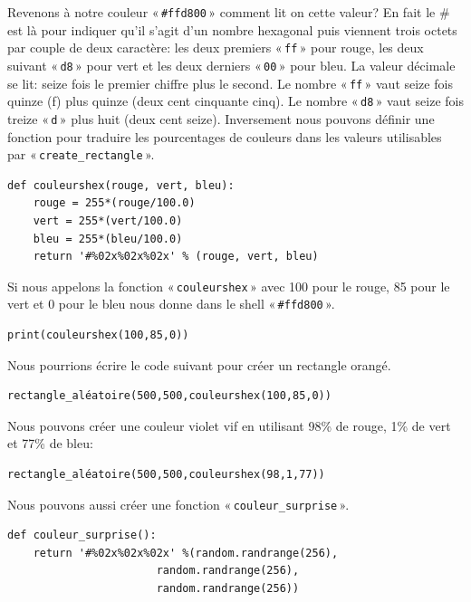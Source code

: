 Revenons à notre couleur « \texttt{\#ffd800} » comment lit on cette valeur? En fait le \# est là pour indiquer qu'il s'agit d'un nombre hexagonal puis viennent trois octets par couple de deux caractère: les deux premiers « \texttt{ff} » pour rouge, les deux suivant « \texttt{d8} » pour vert et les deux derniers « \texttt{00} » pour bleu. La valeur décimale se lit: seize fois le premier chiffre plus le second. Le nombre « \texttt{ff} » vaut seize fois quinze (f) plus quinze (deux cent cinquante cinq). Le nombre « \texttt{d8} » vaut seize fois treize  « \texttt{d} » plus huit (deux cent seize). Inversement nous pouvons définir une fonction pour traduire les pourcentages de couleurs dans les valeurs utilisables par « \texttt{create\_rectangle} ».

\begin{Verbatim}[frame=single,rulecolor=\color{mbleu}, label=à taper]
def couleurshex(rouge, vert, bleu):
    rouge = 255*(rouge/100.0)
    vert = 255*(vert/100.0)
    bleu = 255*(bleu/100.0)
    return '#%02x%02x%02x' % (rouge, vert, bleu)
\end{Verbatim}

Si nous appelons la fonction « \texttt{couleurshex} » avec 100 pour le rouge, 85 pour le vert et 0 pour le bleu nous donne dans le shell « \texttt{\#ffd800} ».

\begin{Verbatim}[frame=single,rulecolor=\color{mbleu}, label=à taper]
print(couleurshex(100,85,0))
\end{Verbatim}

Nous pourrions écrire le code suivant pour créer un rectangle orangé.

\begin{Verbatim}[frame=single,rulecolor=\color{gray}, label=exemple]
rectangle_aléatoire(500,500,couleurshex(100,85,0))
\end{Verbatim}

Nous pouvons créer une couleur violet vif  en utilisant 98\% de rouge, 1\% de vert et 77\% de bleu:
\begin{Verbatim}[frame=single,rulecolor=\color{gray}, label=exemple]
rectangle_aléatoire(500,500,couleurshex(98,1,77))
\end{Verbatim}

Nous pouvons aussi créer une fonction « \texttt{couleur\_surprise} ».
\begin{Verbatim}[frame=single,rulecolor=\color{mbleu}, label=à taper]
def couleur_surprise():
    return '#%02x%02x%02x' %(random.randrange(256),
                       random.randrange(256),
                       random.randrange(256))
\end{Verbatim}
 

